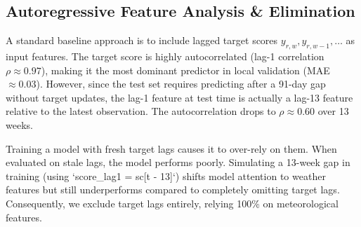 \documentclass[conference]{IEEEtran}
\begin{document}
\subsection{Autoregressive Feature Analysis \& Elimination}
A standard baseline approach is to include lagged target scores $y_{r, w}, y_{r, w-1}, \dots$ as input features. The target score is highly autocorrelated (lag-1 correlation $\rho \approx 0.97$), making it the most dominant predictor in local validation (MAE $\approx 0.03$). However, since the test set requires predicting after a 91-day gap without target updates, the lag-1 feature at test time is actually a lag-13 feature relative to the latest observation. The autocorrelation drops to $\rho \approx 0.60$ over 13 weeks. 

Training a model with fresh target lags causes it to over-rely on them. When evaluated on stale lags, the model performs poorly. Simulating a 13-week gap in training (using `score\_lag1 = sc[t - 13]`) shifts model attention to weather features but still underperforms compared to completely omitting target lags. Consequently, we exclude target lags entirely, relying 100\% on meteorological features.
\end{document}
